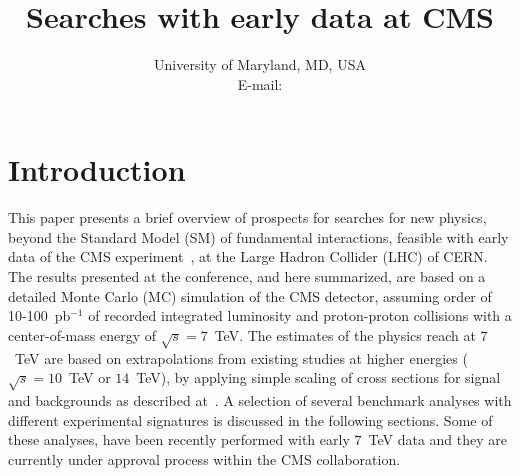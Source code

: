 \documentclass{PoS}
\title{Searches with early data at CMS}
\author{\speaker{Francesco Santanastasio}%
       University of Maryland, MD, USA\\
       E-mail: \email{francesco.santanastasio@cern.ch}}
\begin{document}
\section{Introduction}
This paper presents a brief overview of prospects for searches for new physics, 
beyond the Standard Model (SM) of fundamental interactions, feasible with early data of the 
CMS experiment~\cite{Bayatian:2006zz}, at the Large Hadron Collider (LHC) of CERN.
The results presented at the conference, and here summarized, 
are based on a detailed Monte Carlo (MC) simulation of 
the CMS detector, assuming order of 10-100~pb$^{-1}$ 
of recorded integrated luminosity and proton-proton collisions 
with a center-of-mass energy of $\sqrt{s} = 7$~TeV. 
The estimates of the physics reach at $7$~TeV are based on extrapolations from existing studies 
at higher energies ($\sqrt{s} = 10$~TeV or $14$~TeV), 
by applying simple scaling of cross sections for signal and backgrounds as described 
at~\cite{CMSPhysicsReach7TeV}. A selection of several benchmark analyses with different experimental 
signatures is discussed in the following sections.
Some of these analyses, have been recently performed with early $7$~TeV data 
and they are currently under approval process within the CMS collaboration.
\end{document}

